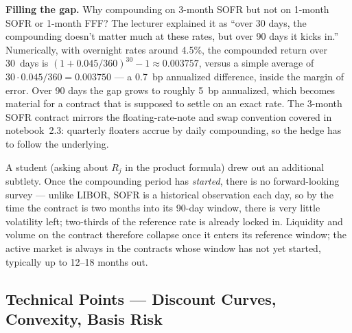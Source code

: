 \begin{tipblock}
\textbf{Filling the gap.} Why compounding on 3-month SOFR but not on
1-month SOFR or 1-month FFF? The lecturer explained it as ``over 30 days,
the compounding doesn't matter much at these rates, but over 90 days it
kicks in.'' Numerically, with overnight rates around 4.5\%, the
compounded return over 30~days is
$(1 + 0.045/360)^{30} - 1 \approx 0.003757$, versus a simple average of
$30 \cdot 0.045/360 = 0.003750$ --- a 0.7~bp annualized difference, inside
the margin of error. Over 90 days the gap grows to roughly 5~bp
annualized, which becomes material for a contract that is supposed to
settle on an exact rate. The 3-month SOFR contract mirrors the
floating-rate-note and swap convention covered in notebook~2.3: quarterly
floaters accrue by daily compounding, so the hedge has to follow the
underlying.
\end{tipblock}

A student (asking about $R_j$ in the product formula) drew out an
additional subtlety. Once the compounding period has \emph{started}, there
is no forward-looking survey --- unlike LIBOR, SOFR is a historical
observation each day, so by the time the contract is two months into its
90-day window, there is very little volatility left; two-thirds of the
reference rate is already locked in. Liquidity and volume on the contract
therefore collapse once it enters its reference window; the active market
is always in the contracts whose window has not yet started, typically
up to 12--18 months out.

\subsection{Technical Points --- Discount Curves, Convexity, Basis Risk}\label{L3-sec:stir-tech}

